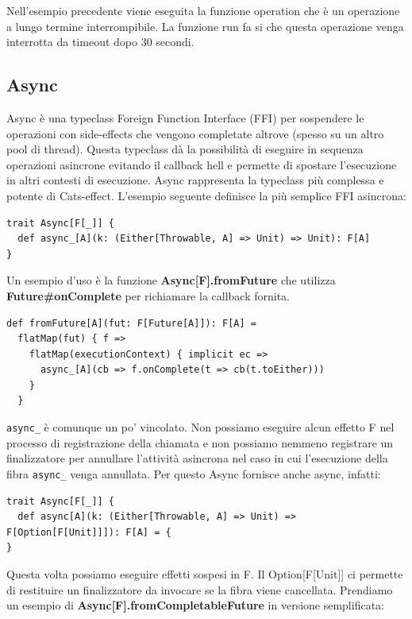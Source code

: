 \noindent Nell’esempio precedente viene eseguita la funzione operation che è un operazione a lungo termine interrompibile. La funzione run fa si che questa operazione venga  interrotta da timeout dopo 30 secondi.

\subsection{Async}
Async è una typeclass Foreign Function Interface (FFI) per sospendere le operazioni con side-effects che vengono completate altrove (spesso su un altro pool di thread). Questa typeclass dà la possibilità di eseguire in sequenza operazioni asincrone evitando il callback hell e permette
di spostare l’esecuzione in altri contesti di esecuzione. Async rappresenta la typeclass più complessa e potente di Cats-effect. L'esempio seguente definisce la più semplice FFI asincrona:

\begin{verbatim}
trait Async[F[_]] {
  def async_[A](k: (Either[Throwable, A] => Unit) => Unit): F[A]
}
\end{verbatim}

Un esempio d'uso è la funzione \textbf{Async[F].fromFuture} che utilizza \textbf{Future\#onComplete} per richiamare la callback fornita.

\begin{verbatim}
def fromFuture[A](fut: F[Future[A]]): F[A] =
  flatMap(fut) { f =>
    flatMap(executionContext) { implicit ec =>
      async_[A](cb => f.onComplete(t => cb(t.toEither)))
    }
  }
\end{verbatim}

\noindent \texttt{async\_} è comunque un po' vincolato. Non possiamo eseguire alcun effetto F nel processo di registrazione della chiamata e non possiamo nemmeno registrare un finalizzatore per annullare l'attività asincrona nel caso in cui l'esecuzione della fibra \texttt{async\_} venga annullata. Per questo Async fornisce anche async, infatti:

\begin{verbatim}
trait Async[F[_]] {
  def async[A](k: (Either[Throwable, A] => Unit) => F[Option[F[Unit]]]): F[A] = {
}
\end{verbatim}

\noindent Questa volta possiamo eseguire effetti sospesi in F. Il Option[F[Unit]] ci permette di restituire un finalizzatore da invocare se la fibra viene cancellata. Prendiamo un esempio di \textbf{Async[F].fromCompletableFuture} in versione semplificata:

